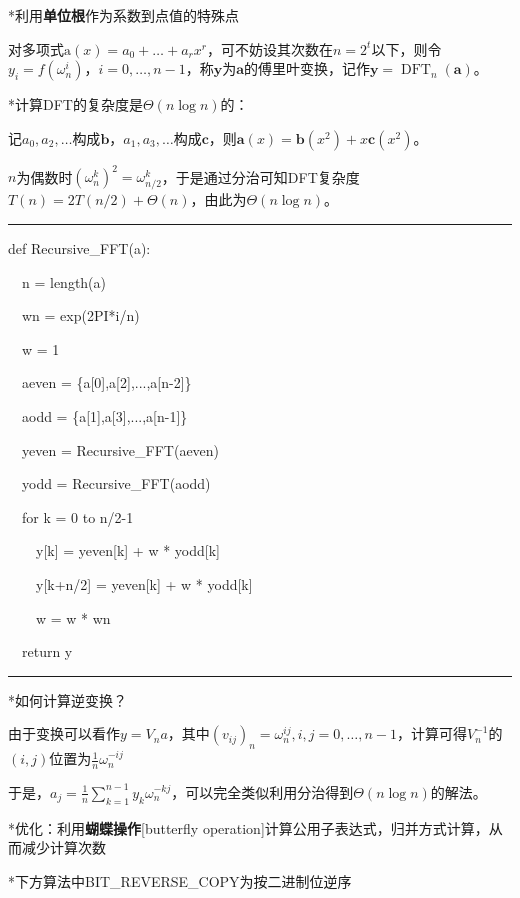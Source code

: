 \documentclass[a4paper,UTF8,fontset=windows]{ctexart}
\DeclareMathOperator{\DFT}{DFT}
\newenvironment{code}{\rule{36em}{0.1em}\setlength{\parindent}{1em}

}{

\setlength{\parindent}{0em}\rule{36em}{0.1em}}
\begin{document}
*\hspace{0em}利用\textbf{单位根}作为系数到点值的特殊点

对多项式$\mathrm{a}(x)=a_0+\dots+a_rx^r$，可不妨设其次数在$n=2^t$以下，则令$y_i=f(\omega_n^i)$，$i=0,\dots,n-1$，称$\mathbf{y}$为$\mathbf{a}$的傅里叶变换，记作$\mathbf{y}=\DFT_n(\mathbf{a})$。

*\hspace{0em}计算DFT的复杂度是$\Theta(n\log n)$的：

记$a_0,a_2,\dots$构成$\mathbf{b}$，$a_1,a_3,\dots$构成$\mathbf{c}$，则$\mathbf{a}(x)=\mathbf{b}(x^2)+x\mathbf{c}(x^2)$。

$n$为偶数时$(\omega_n^k)^2=\omega_{n/2}^k$，于是通过分治可知DFT复杂度$T(n)=2T(n/2)+\Theta(n)$，由此为$\Theta(n\log n)$。

\begin{code}

def Recursive\_FFT(a):

\ \ n = length(a)

\ \ wn = exp(2PI*i/n)

\ \ w = 1

\ \ aeven = \{a[0],a[2],...,a[n-2]\}

\ \ aodd = \{a[1],a[3],...,a[n-1]\}

\ \ yeven = Recursive\_FFT(aeven)

\ \ yodd = Recursive\_FFT(aodd)

\ \ for k = 0 to n/2-1

\ \ \ \ y[k] = yeven[k] + w * yodd[k]

\ \ \ \ y[k+n/2] = yeven[k] + w * yodd[k]

\ \ \ \ w = w * wn

\ \ return y
\end{code}

*\hspace{0em}如何计算逆变换？

由于变换可以看作$y=V_na$，其中$(v_{ij})_n=\omega_n^{ij},i,j=0,\dots,n-1$，计算可得$V^{-1}_n$的$(i,j)$位置为$\frac{1}{n}\omega_{n}^{-ij}$

于是，$a_j=\frac{1}{n}\sum_{k=1}^{n-1}y_k\omega_n^{-kj}$，可以完全类似利用分治得到$\Theta(n\log n)$的解法。

*\hspace{0em}优化：利用\textbf{蝴蝶操作}[butterfly operation]计算公用子表达式，归并方式计算，从而减少计算次数

*\hspace{0em}下方算法中BIT\_REVERSE\_COPY为按二进制位逆序
\end{document}
